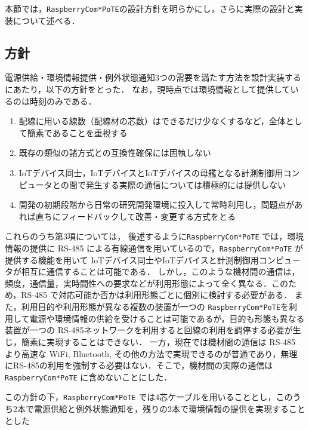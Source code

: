 {本節では，{\tt Raspberry\-Com*PoTE}の設計方針を明らかにし，さらに実際の設計と実装について述べる．


\subsection{方針}

電源供給・環境情報提供・例外状態通知3つの需要を満たす方法を設計実装するにあたり，以下の方針をとった．
なお，現時点では環境情報として提供しているのは時刻のみである．

\begin{enumerate}
\item 配線に用いる線数（配線材の芯数）はできるだけ少なくするなど，全体として簡素であることを重視する
\item 既存の類似の諸方式との互換性確保には固執しない
\item IoTデバイス同士，IoTデバイスとIoTデバイスの母艦となる計測制御用コンピュータとの間で発生する実際の通信については積極的には提供しない
\item 開発の初期段階から日常の研究開発環境に投入して常時利用し，問題点があれば直ちにフィードバックして改善・変更する方式をとる
\end{enumerate}


これらのうち第3項については，
後述するように{\tt Raspberry\-Com*PoTE} では，環境情報の提供に RS-485 による有線通信を用いているので，{\tt Raspberry\-Com*PoTE} が提供する機能を用いて IoTデバイス同士やIoTデバイスと計測制御用コンピュータが相互に通信することは可能である．
しかし，このような機材間の通信は，頻度，通信量，実時間性への要求などが利用形態によって全く異なる．このため，RS-485 で対応可能か否かは利用形態ごとに個別に検討する必要がある．
また，利用目的や利用形態が異なる複数の装置が一つの {\tt Raspberry\-Com*PoTE}を利用して電源や環境情報の供給を受けることは可能であるが，目的も形態も異なる装置が一つの RS-485ネットワークを利用すると回線の利用を調停する必要が生じ，簡素に実現することはできない．
一方，現在では機材間の通信は RS-485 より高速な WiFi, Bluetooth, その他の方法で実現できるのが普通であり，無理にRS-485の利用を強制する必要はない．そこで，機材間の実際の通信は {\tt Raspberry\-Com*PoTE} に含めないことにした．

この方針の下，{\tt Raspberry\-Com*PoTE} では4芯ケーブルを用いることとし，このうち2本で電源供給と例外状態通知を，残りの2本で環境情報の提供を実現することとした

}
